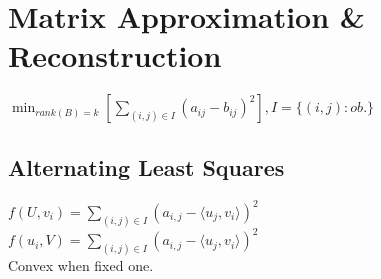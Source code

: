 \section{Matrix Approximation \& Reconstruction}

$\min_{rank(B)=k}[\sum_{(i,j)\in I}{(a_{ij}-b_{ij})^2}], I=\{(i,j): \mathit{ob.}\}$
\subsection*{Alternating Least Squares}
$f(U,v_i) = \sum_{(i,j)\in I} (a_{i,j} - \langle u_j, v_i \rangle)^2$\\
$f(u_i,V) = \sum_{(i,j)\in I} (a_{i,j} - \langle u_j, v_i \rangle)^2$\\
Convex when fixed one.




